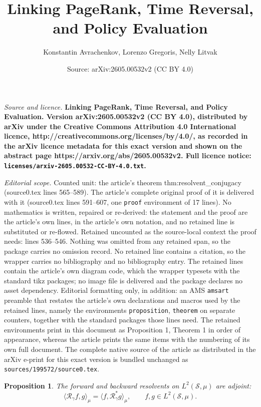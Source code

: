 \documentclass[10pt,a4paper]{amsart}
\title{\bf \Large Linking PageRank, Time Reversal, and Policy Evaluation}
\author{Konstantin Avrachenkov, Lorenzo Gregoris, Nelly Litvak}
\date{Source: arXiv:2605.00532v2 (CC BY 4.0)}
\newtheorem{proposition}{Proposition}
\renewcommand{\S}{\mathcal{S}}
\begin{document}
\maketitle

\noindent\emph{Source and licence.} \bf \Large Linking PageRank, Time Reversal, and Policy Evaluation. Version arXiv:2605.00532v2 (CC BY 4.0), distributed by arXiv under the Creative Commons Attribution 4.0 International licence, http://creativecommons.org/licenses/by/4.0/, as recorded in the arXiv licence metadata for this exact version and shown on the abstract page https://arxiv.org/abs/2605.00532v2. Full licence notice: \texttt{licenses/arxiv-2605.00532-CC-BY-4.0.txt}.\par\smallskip

\noindent\textit{Editorial scope.} Counted unit: the article's theorem thm:resolvent\_conjugacy (source0.tex lines 565--589). The article's complete original proof of it is delivered with it (source0.tex lines 591--607, one \texttt{proof} environment of 17 lines). No mathematics is written, repaired or re-derived: the statement and the proof are the article's own lines, in the article's own notation, and no retained line is substituted or re-flowed.  Retained uncounted as the source-local context the proof needs: lines 536--546.  Nothing was omitted from any retained span, so the package carries no omission record.  No retained line contains a citation, so the wrapper carries no bibliography and no bibliography entry.  The retained lines contain the article's own diagram code, which the wrapper typesets with the standard tikz packages; no image file is delivered and the package declares no asset dependency.  Editorial formatting only, in addition: an AMS \texttt{amsart} preamble that restates the article's own declarations and macros used by the retained lines, namely the environments \texttt{proposition}, \texttt{theorem} on separate counters, together with the standard packages those lines need.  The retained environments print in this document as Proposition 1, Theorem 1 in order of appearance, whereas the article prints the same items with the numbering of its own full document.  The complete native source of the article as distributed in the arXiv e-print for this exact version is bundled unchanged as \texttt{sources/199572/source0.tex}.
\begin{proposition}
\label{prop:resolvent_adjointness}
The forward and backward resolvents on $L^2(\S,\mu)$
are adjoint:
\[
\langle\mathcal R_\gamma f,g\rangle_\mu
=
\langle f,\mathcal R_\gamma^*g\rangle_\mu,
\qquad f,g\in L^2(\S,\mu).
\]
\end{proposition}
\end{document}
